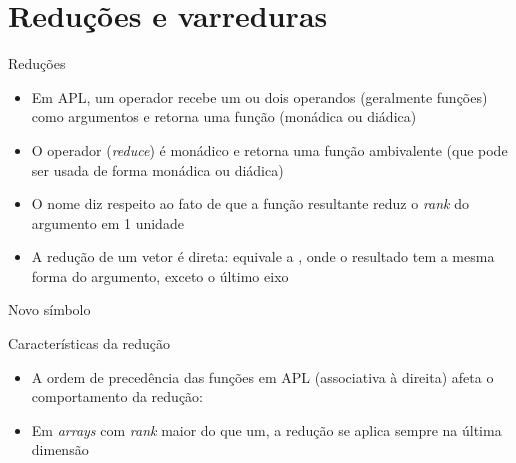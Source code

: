 \section{Reduções e varreduras}


\begin{frame}[fragile]{Reduções}

    \begin{itemize}
        \item Em APL, um operador recebe um ou dois operandos (geralmente funções) como argumentos 
            e retorna uma função (monádica ou diádica)
        \pause

        \item O operador  (\textit{reduce}) é monádico e retorna uma função 
            ambivalente (que pode ser usada de forma monádica ou diádica)
        \pause

        \item O nome diz respeito ao fato de que a função resultante reduz o \textit{rank} do 
            argumento em 1 unidade
        \pause

        \item A redução de um vetor é direta:  equivale a 
            , onde  o resultado tem a mesma forma do argumento, 
            exceto o último eixo

    \end{itemize}

\end{frame}

\begin{frame}[fragile]{Novo símbolo}


\end{frame}

\begin{frame}[fragile]{Características da redução}

    \begin{itemize}
        \item A ordem de precedência das funções em APL (associativa à direita) afeta o comportamento da redução:
        \pause

        \item Em \textit{arrays} com \textit{rank} maior do que um, a redução se aplica sempre na última dimensão
    \end{itemize}

\end{frame}

